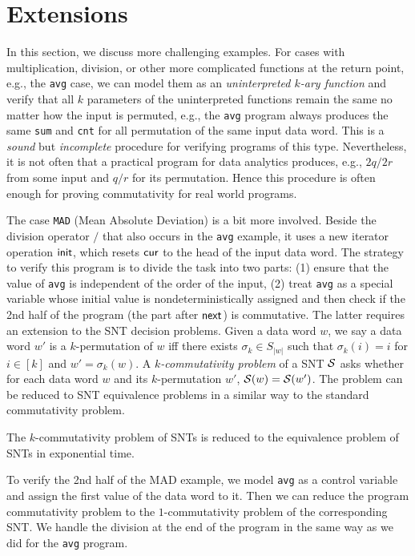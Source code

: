 \section{Extensions}
\label{sec:cases}



In this section, we discuss more challenging examples. 
For cases with multiplication, division, or other more complicated functions at the return point, e.g., the \texttt{avg} case, we can model them as an \emph{uninterpreted $k$-ary function} and verify that all $k$ parameters of the uninterpreted functions remain the same no matter how the input is permuted, e.g., the \texttt{avg} program always produces the same \texttt{sum} and \texttt{cnt} for all permutation of the same input data word. This is a \emph{sound} but \emph{incomplete} procedure for verifying programs of this type. Nevertheless, it is not often that a  practical program for data analytics produces, e.g., $2q/2r$ from some input and $q/r$ for its permutation. Hence this procedure is often enough for proving commutativity for real world programs.

The case \texttt{MAD} (Mean Absolute Deviation) is a bit more involved. Beside the division operator $/$ that also occurs in the \texttt{avg} example, it uses a new iterator operation $\mathsf{init}$, which resets $\mathsf{cur}$ to the head of the input data word. The strategy to verify this program is to divide the task into two parts: (1) ensure that the value of \texttt{avg} is independent of the order of the input, (2) treat \texttt{avg} as a special variable whose initial value is nondeterministically assigned and then check if the 2nd half of the program (the part after $\mathsf{next}$) is commutative. The latter requires an extension to the SNT decision problems. Given a data word $w$, we say a data word $w'$ is a $k$-permutation of $w$ iff there exists $\sigma_k\in S_{|w|}$ such that $\sigma_k(i)=i$ for $i \in [k]$ and $w'=\sigma_k(w)$. A \emph{$k$-commutativity problem} of a SNT ${\mathcal{S} }$ asks whether for each data word $w$ and its $k$-permutation $w'$, ${\mathcal{S} }(w)={\mathcal{S} }(w')$. The problem can be reduced to SNT equivalence problems in a similar way to the standard commutativity problem.
\begin{proposition}\label{prop-snt-kcmm-to-eqv}
	The $k$-commutativity problem of SNTs is reduced to the equivalence problem of SNTs in exponential time. 
\end{proposition}

To verify the 2nd half of the MAD example, we model \texttt{avg} as a control variable and assign the first value of the data word to it. Then we can reduce the program commutativity problem to the $1$-commutativity problem of the corresponding SNT. We handle the division at the end of the program in the same way as we did for the \texttt{avg} program.

